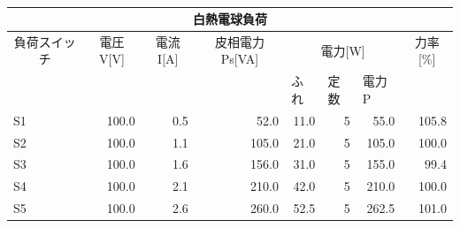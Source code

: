 \documentclass[titlepage]{jarticle}
\begin{document}
\begin{table}[htbp]
    \caption{}
    \begin{tabular}{l|r|r|r|r|r|r|r}
        \multicolumn{ 8}{c}{白熱電球負荷}                                                                                                                                                                                                                                \\ \hline
        \multicolumn{ 1}{c|}{負荷スイッチ} & \multicolumn{ 1}{c|}{電圧V[V]} & \multicolumn{ 1}{c|}{電流I[A]} & \multicolumn{ 1}{c|}{皮相電力Ps[VA]} & \multicolumn{ 3}{c|}{電力[W]} & \multicolumn{ 1}{c}{力率[\%]}                                                      \\ \cline{ 5- 7}
        \multicolumn{ 1}{l|}{}             & \multicolumn{ 1}{l|}{}         & \multicolumn{ 1}{l|}{}         & \multicolumn{ 1}{l|}{}               & \multicolumn{1}{l|}{ふれ}     & \multicolumn{1}{l|}{定数}     & \multicolumn{1}{l|}{電力P} & \multicolumn{ 1}{l}{} \\ \hline \hline
        S1                                 & 100.0                          & 0.5                            & 52.0                                 & 11.0                          & 5                             & 55.0                       & 105.8                 \\ \hline
        S2                                 & 100.0                          & 1.1                            & 105.0                                & 21.0                          & 5                             & 105.0                      & 100.0                 \\ \hline
        S3                                 & 100.0                          & 1.6                            & 156.0                                & 31.0                          & 5                             & 155.0                      & 99.4                  \\ \hline
        S4                                 & 100.0                          & 2.1                            & 210.0                                & 42.0                          & 5                             & 210.0                      & 100.0                 \\ \hline
        S5                                 & 100.0                          & 2.6                            & 260.0                                & 52.5                          & 5                             & 262.5                      & 101.0                 \\ \hline
    \end{tabular}
    \label{}
\end{table}
\end{document}
